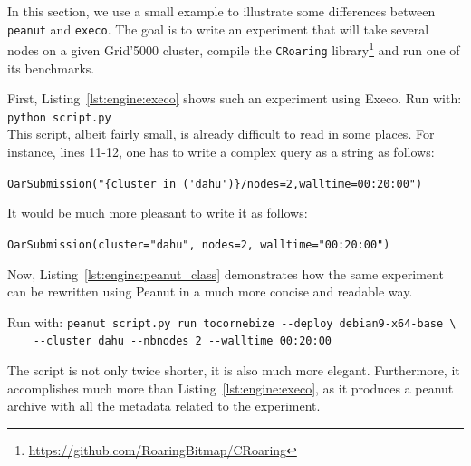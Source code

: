             In this section, we use a small example to illustrate some differences between \texttt{peanut} and
            \texttt{execo}. The goal is to write an experiment that will take several nodes on a given Grid'5000
            cluster, compile the \texttt{CRoaring} library\footnote{\url{https://github.com/RoaringBitmap/CRoaring}} and
            run one of its benchmarks.

            \lstset{basicstyle=\scriptsize, style=custom_lst_style}

            First, Listing~\ref{lst:engine:execo} shows such an experiment using Execo. Run with: \verb#python script.py#\\

            

            This script, albeit fairly small, is already difficult to read in some places. For instance, lines 11-12,
            one has to write a complex query as a string as follows:

            \verb#OarSubmission("{cluster in ('dahu')}/nodes=2,walltime=00:20:00")#

            It would be much more pleasant to write it as follows:

            \verb#OarSubmission(cluster="dahu", nodes=2, walltime="00:20:00")#

            Now, Listing~\ref{lst:engine:peanut_class} demonstrates how the same experiment can be rewritten using Peanut
            in a much more concise and readable way.

            Run with: \verb#peanut script.py run tocornebize --deploy debian9-x64-base \#\\
            \verb#    --cluster dahu --nbnodes 2 --walltime 00:20:00#

            

            The script is not only twice shorter, it is also much more elegant. Furthermore, it accomplishes much more
            than Listing~\ref{lst:engine:execo}, as it produces a peanut archive with all the metadata related to the
            experiment.

